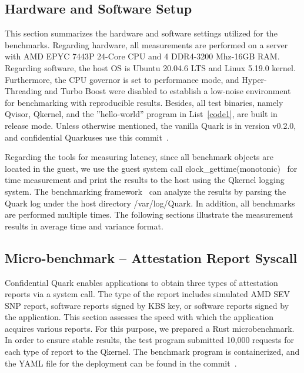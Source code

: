 \subsection{Hardware and Software Setup}\label{Hardware_and_Software_Setup}

This section summarizes the hardware and software settings utilized for the benchmarks. Regarding hardware, all measurements are performed on a server with AMD EPYC 7443P 24-Core CPU and 4 DDR4-3200 Mhz-16GB RAM. Regarding software, the host OS is Ubuntu 20.04.6 LTS and Linux 5.19.0 kernel. 
Furthermore, the CPU governor is set to performance mode, and Hyper-Threading and Turbo Boost were disabled to establish a low-noise environment for benchmarking with reproducible results. Besides, all test binaries, namely Qvisor, Qkernel, and the ”hello-world” program in List~\ref{code1}, are built in 
release mode. Unless otherwise mentioned, the vanilla Quark is in version v0.2.0, and confidential Quarkuses use this commit~\cite*{qualitativ_confidentail_quark}.


Regarding the tools for measuring latency, since all benchmark objects are located in the guest, we use the guest system call clock\_gettime(monotonic)~\cite*{clock_gettime} for time measurement and print the results to the host using the Qkernel logging system. The 
benchmarking framework~\cite*{benchamark_framework} can analyze the results by parsing the Quark log under the host directory /var/log/Quark. In addition, all benchmarks are performed multiple times. The following sections illustrate the measurement results in average time and variance format.



\subsection{Micro-benchmark – Attestation Report Syscall}\label{Attestation_Report_Syscall}

Confidential Quark enables applications to obtain three types of attestation reports via a system call. The type of the report includes simulated AMD SEV SNP report, software reports signed by KBS key, or software reports signed by the application. This section assesses the speed with which the 
application acquires various reports. For this purpose, we prepared a Rust microbenchmark\cite*{benchamark_Attestation_Report_Syscall}. In order to ensure stable results, the test program submitted 10,000 requests for each type of report to the Qkernel. The benchmark program is containerized, 
and the YAML file for the deployment can be found in the commit~\cite*{perf_attestation_report}.

